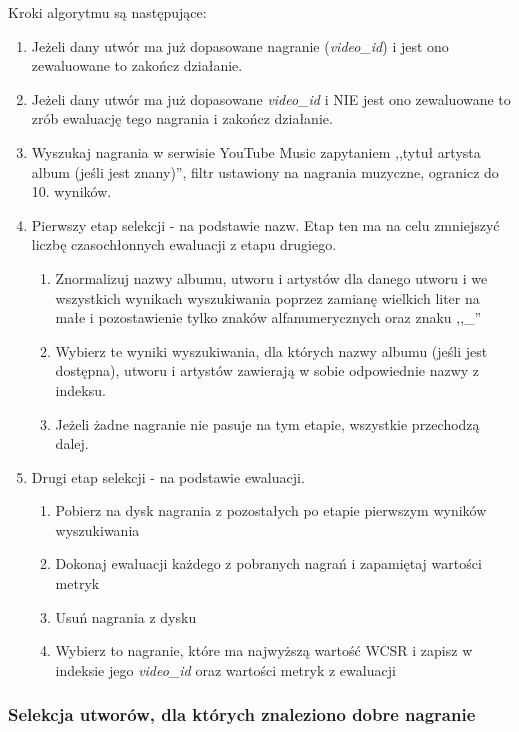 Kroki algorytmu są następujące:
\begin{enumerate}
    \item Jeżeli dany utwór ma już dopasowane nagranie (\emph{video\_id}) i jest ono zewaluowane to
        zakończ działanie.
    \item Jeżeli dany utwór ma już dopasowane \emph{video\_id} i NIE jest ono zewaluowane to zrób
        ewaluację tego nagrania i zakończ działanie.
    \item Wyszukaj nagrania w serwisie YouTube Music zapytaniem ,,tytuł artysta album (jeśli jest
        znany)'', filtr ustawiony na nagrania muzyczne, ogranicz do 10. wyników.
    \item Pierwszy etap selekcji - na podstawie nazw. Etap ten ma na celu zmniejszyć liczbę
        czasochłonnych ewaluacji z etapu drugiego. 
        \begin{enumerate}
            \item Znormalizuj nazwy albumu, utworu i artystów dla danego utworu i we wszystkich
                wynikach wyszukiwania poprzez zamianę wielkich liter na małe i pozostawienie tylko
                znaków alfanumerycznych oraz znaku ,,\_''
            \item Wybierz te wyniki wyszukiwania, dla których nazwy albumu (jeśli jest
                dostępna), utworu i artystów zawierają w sobie odpowiednie nazwy z indeksu.
            \item Jeżeli żadne nagranie nie pasuje na tym etapie, wszystkie przechodzą dalej.
        \end{enumerate}
    \item Drugi etap selekcji - na podstawie ewaluacji.
        \begin{enumerate}
            \item Pobierz na dysk nagrania z pozostałych po etapie pierwszym wyników wyszukiwania
            \item Dokonaj ewaluacji każdego z pobranych nagrań i zapamiętaj wartości metryk
            \item Usuń nagrania z dysku
            \item Wybierz to nagranie, które ma najwyższą wartość WCSR i zapisz w indeksie jego
                \emph{video\_id} oraz wartości metryk z ewaluacji
        \end{enumerate}
\end{enumerate}

\subsubsection{Selekcja utworów, dla których znaleziono dobre nagranie}


% 
